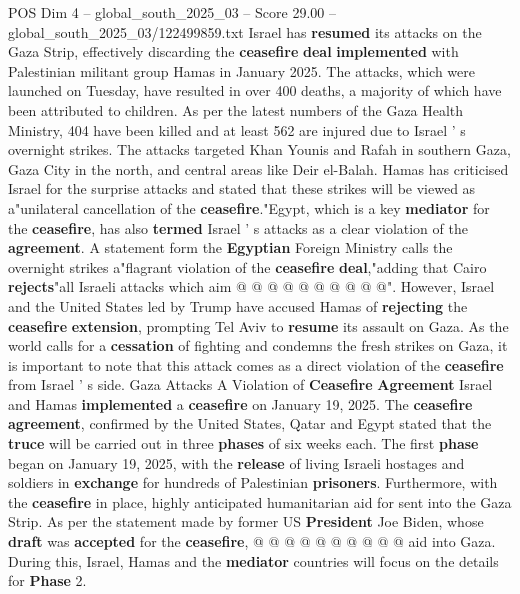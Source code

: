 \begin{textsample}{POS Dim 4 – global\_south\_2025\_03 – Score 29.00 – global\_south\_2025\_03/122499859.txt}  \label{ex:f4_pos_040}
Israel has \textbf{resumed} its attacks on the Gaza Strip, effectively discarding the \textbf{ceasefire} \textbf{deal} \textbf{implemented} with Palestinian militant group Hamas in January 2025.
The attacks, which were launched on Tuesday, have resulted in over 400 deaths, a majority of which have been attributed to children.
As per the latest numbers of the Gaza Health Ministry, 404 have been killed and at least 562 are injured due to Israel ' s overnight strikes.
The attacks targeted Khan Younis and Rafah in southern Gaza, Gaza City in the north, and central areas like Deir el-Balah.
Hamas has criticised Israel for the surprise attacks and stated that these strikes will be viewed as a"unilateral cancellation of the \textbf{ceasefire}."Egypt, which is a key \textbf{mediator} for the \textbf{ceasefire}, has also \textbf{termed} Israel ' s attacks as a clear violation of the \textbf{agreement}.
A statement form the \textbf{Egyptian} Foreign Ministry calls the overnight strikes a"flagrant violation of the \textbf{ceasefire} \textbf{deal},"adding that Cairo \textbf{rejects}"all Israeli attacks which aim @ @ @ @ @ @ @ @ @ @".
However, Israel and the United States led by Trump have accused Hamas of \textbf{rejecting} the \textbf{ceasefire} \textbf{extension}, prompting Tel Aviv to \textbf{resume} its assault on Gaza.
As the world calls for a \textbf{cessation} of fighting and condemns the fresh strikes on Gaza, it is important to note that this attack comes as a direct violation of the \textbf{ceasefire} from Israel ' s side.
Gaza Attacks A Violation of \textbf{Ceasefire} \textbf{Agreement} Israel and Hamas \textbf{implemented} a \textbf{ceasefire} on January 19, 2025.
The \textbf{ceasefire} \textbf{agreement}, confirmed by the United States, Qatar and Egypt stated that the \textbf{truce} will be carried out in three \textbf{phases} of six weeks each.
The first \textbf{phase} began on January 19, 2025, with the \textbf{release} of living Israeli hostages and soldiers in \textbf{exchange} for hundreds of Palestinian \textbf{prisoners}.
Furthermore, with the \textbf{ceasefire} in place, highly anticipated humanitarian aid for sent into the Gaza Strip.
As per the statement made by former US \textbf{President} Joe Biden, whose \textbf{draft} was \textbf{accepted} for the \textbf{ceasefire}, @ @ @ @ @ @ @ @ @ @ aid into Gaza.
During this, Israel, Hamas and the \textbf{mediator} countries will focus on the details for \textbf{Phase} 2.

\end{textsample}
